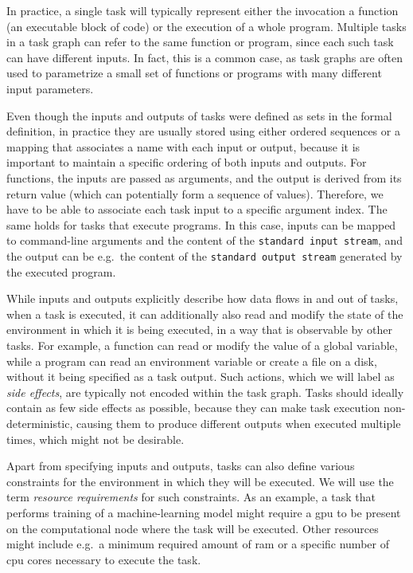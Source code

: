 In practice, a single task will typically represent either the invocation a function (an executable
block of code) or the execution of a whole program. Multiple tasks in a task graph can refer to the
same function or program, since each such task can have different inputs. In fact, this is a common
case, as task graphs are often used to parametrize a small set of functions or programs with many
different input parameters.

Even though the inputs and outputs of tasks were defined as sets in the formal definition, in
practice they are usually stored using either ordered sequences or a mapping that associates a name
with each input or output, because it is important to maintain a specific ordering of both inputs
and outputs. For functions, the inputs are passed as arguments, and the output is derived from its
return value (which can potentially form a sequence of values). Therefore, we have to be able to
associate each task input to a specific argument index. The same holds for tasks that execute
programs. In this case, inputs can be mapped to command-line arguments and the content of the
\texttt{standard input stream}, and the output can be e.g.\ the content of the \texttt{standard output stream}
generated by the executed program.

While inputs and outputs explicitly describe how data flows in and out of tasks, when a task is
executed, it can additionally also read and modify the state of the environment in which it is
being executed, in a way that is observable by other tasks. For example, a function can read or
modify the value of a global variable, while a program can read an environment variable or create a
file on a disk, without it being specified as a task output. Such actions, which we will label as
\emph{side effects}, are typically not encoded within the task graph. Tasks should ideally
contain as few side effects as possible, because they can make task execution non-deterministic,
causing them to produce different outputs when executed multiple times, which might not be
desirable.


Apart from specifying inputs and outputs, tasks can also define various constraints for the
environment in which they will be executed. We will use the term \emph{resource requirements} for such
constraints. As an example, a task that performs training of a machine-learning model might require
a \gls{gpu} to be present on the computational node where the task will be executed.
Other resources might include e.g.\ a minimum required amount of \gls{ram} or a
specific number of \gls{cpu} cores necessary to execute the task.

